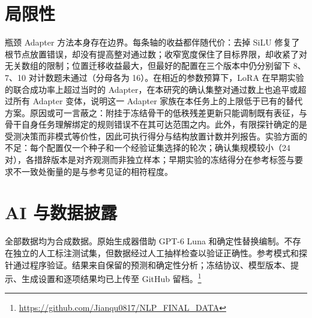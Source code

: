 \section*{局限性}
瓶颈 Adapter 方法本身存在边界。每条轴的收益都伴随代价：去掉 SiLU 修复了根节点放置错误，却没有提高整对通过数；收窄宽度保住了目标界限，却收紧了对无关数组的限制；位置迁移收益最大，但最好的配置在三个版本中仍分别留下 8、7、10 对计数题未通过（分母各为 16）。在相近的参数预算下，LoRA 在早期实验的联合成功率上超过当时的 Adapter，在本研究的确认集整对通过数上也追平或超过所有 Adapter 变体，说明这一 Adapter 家族在本任务上的上限低于已有的替代方案。原因或可一言蔽之：附挂于冻结骨干的低秩残差更新只能调制既有表征，与骨干自身任务理解绑定的规则错误不在其可达范围之内。此外，有限探针确定的是受测决策而非模式等价性，因此可执行得分与结构放置计数并列报告。实验方面的不足：每个配置仅一个种子和一个经验证集选择的轮次；确认集规模较小（24 对），各措辞版本是对齐观测而非独立样本；早期实验的冻结得分在参考标签与要求不一致处衡量的是与参考见证的相符程度。

\section*{AI 与数据披露}
全部数据均为合成数据。原始生成器借助 GPT-6 Luna 和确定性替换编制。不存在独立的人工标注测试集，但数据经过人工抽样检查以验证正确性。参考模式和探针通过程序验证。结果来自保留的预测和确定性分析；冻结协议、模型版本、提示、生成设置和逐项结果均已上传至 GitHub 留档。\footnote{\url{https://github.com/Jianqu0817/NLP_FINAL_DATA}}


